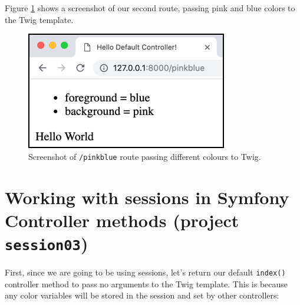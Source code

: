 \documentclass[a4paperpaper,openright]{book}
\newenvironment{Shaded}{}{}
\newcommand{\AnnotationTok}[1]{\textcolor[rgb]{0.38,0.63,0.69}{\textbf{\textit{#1}}}}
\newcommand{\CommentTok}[1]{\textcolor[rgb]{0.38,0.63,0.69}{\textit{#1}}}
\newcommand{\KeywordTok}[1]{\textcolor[rgb]{0.00,0.44,0.13}{\textbf{#1}}}
\newcommand{\NormalTok}[1]{#1}
\newcommand{\OtherTok}[1]{\textcolor[rgb]{0.00,0.44,0.13}{#1}}
\newcommand{\StringTok}[1]{\textcolor[rgb]{0.25,0.44,0.63}{#1}}
\begin{document}
Figure \ref{twig_colours} shows a screenshot of our second route,
passing pink and blue colors to the Twig template.

\begin{figure}
\centering
\includegraphics{./tex2pdf.-8aed53dcd332a606/208cfa06fb9ee48e693def7d3b21bfe0a1bed489.png}
\caption{Screenshot of \texttt{/pinkblue} route passing different
colours to Twig. \label{twig_colours}}
\end{figure}

\hypertarget{working-with-sessions-in-symfony-controller-methods-project-session03}{%
\section{\texorpdfstring{Working with sessions in Symfony Controller
methods (project
\texttt{session03})}{Working with sessions in Symfony Controller methods (project session03)}}\label{working-with-sessions-in-symfony-controller-methods-project-session03}}

First, since we are going to be using sessions, let's return our default
\texttt{index()} controller method to pass no arguments to the Twig
template. This is because any color variables will be stored in the
session and set by other controllers:

\begin{Shaded}
\end{Shaded}
\end{document}
